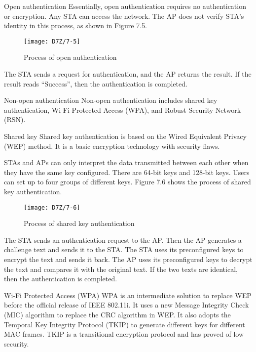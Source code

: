 \documentclass[a4paper,12pt]{book}
\begin{document}
\begin{term}{Open authentication}
    Essentially, open authentication requires no authentication or encryption. Any STA can access the network. The AP does not verify STA’s identity in this process, as shown in Figure 7.5.

    \begin{figure}[!h]
        \centering
        \texttt{[image: D7Z/7-5]}
        \caption{Process of open authentication}
    \end{figure}

    The STA sends a request for authentication, and the AP returns the result. If the result reads “Success”, then the authentication is completed.
\end{term}

\begin{term}{Non-open authentication}
    Non-open authentication includes shared key authentication, Wi-Fi Protected Access (WPA), and Robust Security Network (RSN).

    \parskip 6pt
    \begin{secterm}{Shared key}
        Shared key authentication is based on the Wired Equivalent Privacy (WEP) method. It is a basic encryption technology with security flaws.
        
        STAs and APs can only interpret the data transmitted between each other when they have the same key configured. There are 64-bit keys and 128-bit keys. Users can set up to four groups of different keys. Figure 7.6 shows the process of shared key authentication.

        \begin{figure}[!h]
            \centering
            \texttt{[image: D7Z/7-6]}
            \caption{Process of shared key authentication}
        \end{figure}

        The STA sends an authentication request to the AP. Then the AP generates a challenge text and sends it to the STA. The STA uses its preconfigured keys to encrypt the text and sends it back. The AP uses its preconfigured keys to decrypt the text and compares it with the original text. If the two texts are identical, then the authentication is completed.
    \end{secterm}

    \begin{secterm}{Wi-Fi Protected Access (WPA)}
        WPA is an intermediate solution to replace WEP before the official release of IEEE 802.11i. It uses a new Message Integrity Check (MIC) algorithm to replace the CRC algorithm in WEP. It also adopts the Temporal Key Integrity Protocol (TKIP) to generate different keys for different MAC frames. TKIP is a transitional encryption protocol and has proved of low security.
    \end{secterm}


\end{term}
\end{document}
